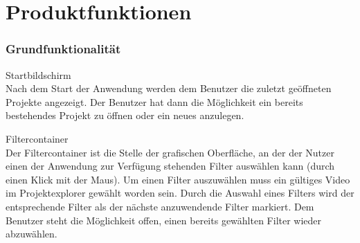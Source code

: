 \chapter {Produktfunktionen}

\subsection{Grundfunktionalität}
\setcounter{counterKriterien}{0}

 Startbildschirm \\
Nach dem Start der Anwendung werden dem Benutzer die zuletzt geöffneten Projekte angezeigt. Der Benutzer
hat dann die Möglichkeit ein bereits bestehendes Projekt zu öffnen oder ein neues anzulegen.
 
 Filtercontainer \\
Der Filtercontainer ist die Stelle der grafischen Oberfläche, an der der Nutzer einen der Anwendung
zur Verfügung stehenden Filter auswählen kann (durch einen Klick mit der Maus). Um einen Filter auszuwählen
muss ein gültiges Video im Projektexplorer gewählt worden sein. Durch die Auswahl eines Filters wird
der entsprechende Filter als der nächste anzuwendende Filter markiert. Dem Benutzer steht die Möglichkeit offen, einen bereits gewählten Filter wieder abzuwählen.

